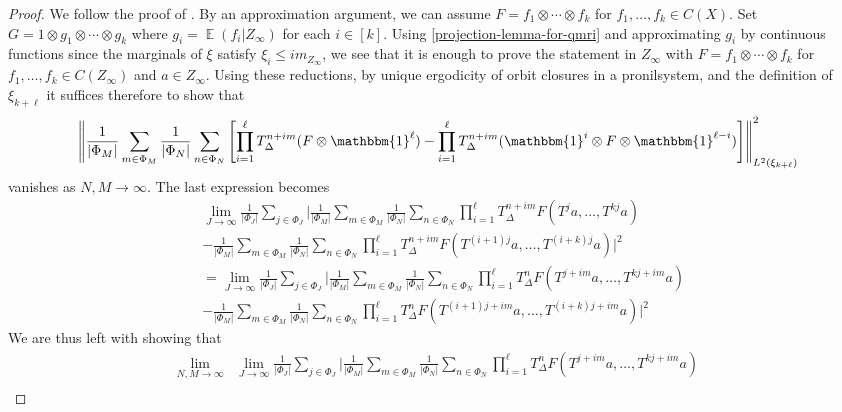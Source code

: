 \documentclass[letter, 11pt]{article}
\theoremstyle{definition}
\theoremstyle{plain}
\newcommand{\norm}[1]{\left\lVert#1\right\rVert}
\providecommand{\norm}[1]{\lVert #1\rVert}
\newcommand{\1}{\mathbbm{1}}
\newcommand{\E}{\operatorname{\mathbb{E}}}
\begin{document}
\begin{proof}
We follow the proof of \cite[Theorem 6.2]{kmrr25}. By an approximation argument, we can assume $F=f_1\otimes \cdots \otimes f_k$ for $f_1,\ldots,f_k\in C(X)$. Set $G=1\otimes g_1\otimes \cdots \otimes g_k$ where $g_i=\E( f_i | Z_\infty)$ for each $i\in [k]$. Using \cref{projection-lemma-for-qmri} and approximating $g_i$ by continuous functions since the marginals of $\xi$ satisfy $\xi_i \leq i m_{Z_{\infty}}$, we see that it is enough to prove the statement in $Z_\infty$ with $F=f_1\otimes \cdots \otimes f_k$ for $f_1,\ldots,f_k\in C(Z_\infty)$ and $a \in Z_{\infty}$. Using these reductions, by unique ergodicity of orbit closures in a pronilsystem, and the definition of $\xi_{k+\ell}$ it suffices therefore to show that
$$\norm{ \frac{1}{|\Phi_M|} \sum_{m\in \Phi_M} \frac{1}{|\Phi_N|} \sum_{n\in \Phi_N} \left[ \prod_{i=1}^{\ell} T_\Delta^{n+im}  (F\otimes \1^{\ell}) -\prod_{i=1}^{\ell} T_\Delta^{n+im}  (\1^{i} \otimes F\otimes \1^{\ell-i}) \right]}^2_{L^2(\xi_{k+\ell})}$$
vanishes as $N,M\to \infty$. The last expression becomes
\begin{align*}
      &\lim_{J\to \infty}\frac{1}{|\Phi_J|}\sum_{j\in \Phi_J} \Bigg| \frac{1}{|\Phi_M|}\sum_{m\in \Phi_M} \frac{1}{|\Phi_N|} \sum_{n\in \Phi_N}  \prod_{i=1}^{\ell} T_\Delta^{n+im}  F(T^ja,\ldots,T^{kj}a) \\
      &- \frac{1}{|\Phi_M|}\sum_{m\in \Phi_M} \frac{1}{|\Phi_N|} \sum_{n\in \Phi_N}\prod_{i=1}^{\ell} T_\Delta^{n+im}  F (T^{(i+1)j}a,\ldots, T^{(i+k)j}a)\Bigg|^2 \\
      &=\lim_{J\to \infty}\frac{1}{|\Phi_J|}\sum_{j\in \Phi_J} \Bigg| \frac{1}{|\Phi_M|}\sum_{m\in \Phi_M} \frac{1}{|\Phi_N|} \sum_{n\in \Phi_N}  \prod_{i=1}^{\ell} T_\Delta^{n}  F(T^{j+im}a,\ldots,T^{kj+im}a) \\
      &- \frac{1}{|\Phi_M|}\sum_{m\in \Phi_M} \frac{1}{|\Phi_N|} \sum_{n\in \Phi_N}\prod_{i=1}^{\ell} T_\Delta^{n}  F (T^{(i+1)j+im}a,\ldots, T^{(i+k)j+im}a)\Bigg|^2 
\end{align*}
We are thus left with showing that 
\begin{align*}
\lim_{N,M\to \infty}&\lim_{J\to \infty}\frac{1}{|\Phi_J|}\sum_{j\in \Phi_J} \Bigg| \frac{1}{|\Phi_M|}\sum_{m\in \Phi_M} \frac{1}{|\Phi_N|} \sum_{n\in \Phi_N}  \prod_{i=1}^{\ell} T_\Delta^{n}  F(T^{j+im}a,\ldots,T^{kj+im}a) \\

\end{align*}
\end{proof}
\end{document}
